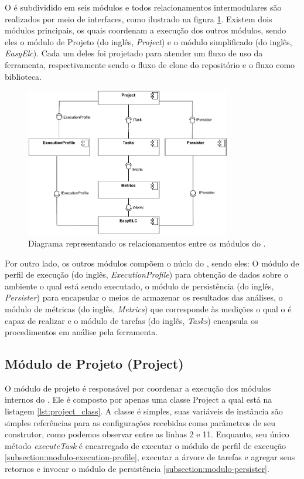 \documentclass[12pt]{tcc}
\begin{document}
	O  é subdividido em seis módulos e todos relacionamentos intermodulares são realizados por meio de interfaces, como ilustrado na figura \ref{fig:diagrama-arquitetura}.
	Existem dois módulos principais, os quais coordenam a execução dos outros módulos, sendo eles o módulo de Projeto (do inglês, \emph{Project}) e o módulo  simplificado (do inglês, \emph{EasyElc}).
	Cada um deles foi projetado para atender um fluxo de uso da ferramenta, respectivamente sendo o fluxo de clone do repositório e o fluxo como biblioteca.

	\begin{figure}[!ht]
		\centering
		\includegraphics[width=0.8\textwidth]{figures/diagramaarquiteturaelchupacabra.pdf}
		\caption[Diagrama de Módulos]{Diagrama representando os relacionamentos entre os módulos do .}
		\label{fig:diagrama-arquitetura}
	\end{figure}
	
	Por outro lado, os outros módulos compõem o núclo do , sendo eles: O módulo de perfil de execução (do inglês, \emph{ExecutionProfile}) para obtenção de dados sobre o ambiente o qual está sendo executado, o módulo de persistência (do inglês, \emph{Persister}) para encapsular o meios de armazenar os resultados das análises, o módulo de métricas (do inglês, \emph{Metrics}) que corresponde às medições o qual o  é capaz de realizar e o módulo de tarefas (do inglês, \emph{Tasks}) encapsula os procedimentos em análise pela ferramenta.


	\subsection{Módulo de Projeto (Project)}
	\label{subsection:modulo-project}

	O módulo de projeto é responsável por coordenar a execução dos módulos internos do .
	Ele é composto por apenas uma classe Project a qual está na listagem \ref{lst:project_class}.
	A classe é simples, suas variáveis de instância são simples referências para as configurações recebidas como parâmetros de seu construtor, como podemos observar entre as linhas 2 e 11.
	Enquanto, seu único método \emph{executeTask} é encarregado de executar o módulo de perfil de execução \ref{subsection:modulo-execution-profile}, executar a árvore de tarefas e agregar seus retornos e invocar o módulo de persistência \ref{subsection:modulo-persister}.
\end{document}
